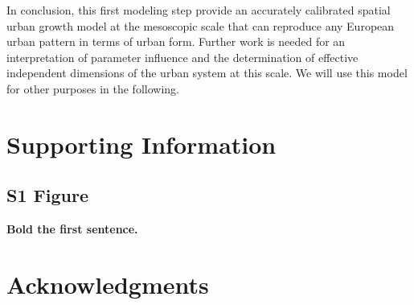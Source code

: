 \documentclass[10pt,letterpaper]{article}
\begin{document}
In conclusion, this first modeling step provide an accurately calibrated spatial urban growth model at the mesoscopic scale that can reproduce any European urban pattern in terms of urban form. Further work is needed for an interpretation of parameter influence and the determination of effective independent dimensions of the urban system at this scale. We will use this model for other purposes in the following.




\section*{Supporting Information}

\subsection*{S1 Figure}
\label{S1_Figure}
{\bf Bold the first sentence.}



\section*{Acknowledgments}



\nolinenumbers

%
%
% 





%
%
%
%
%
%
\end{document}
